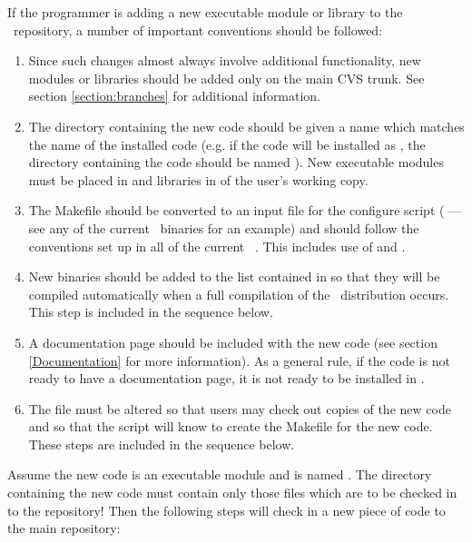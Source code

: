 If the programmer is adding a new executable module or library to the
\PSIthree\ repository, a number of important conventions should be followed:

\begin{enumerate}
\item Since such changes almost always involve additional functionality,
new modules or libraries should be added only on the main CVS trunk.
See section \ref{section:branches} for additional information.

\item The directory containing the new code should be given a name
which matches the name of the installed code (e.g. if the code
will be installed as , the directory containing
the code should be named ). New executable modules
must be placed in  and libraries in
 of the user's working copy.

\item The Makefile should be converted to an input file for the configure
script ( --- see any of the current \PSIthree\ binaries
for an example) and should follow the conventions set up in all of the
current \PSIthree\ . This includes use of 
and .

\item New binaries should be added to the list contained in
 so that they will be compiled
automatically when a full compilation of the \PSIthree\ distribution
occurs. This step is included in the sequence below.

\item A documentation page should be included with the new code (see
section \ref{Documentation} for more information). As a general rule,
if the code is not ready to have a documentation page, it is not ready
to be installed in \PSIthree. 

\item The  file must be altered so that users may check
out copies of the new code and so that the  script will
know to create the Makefile for the new code. These steps are included in
the sequence below.

\end{enumerate}

Assume the new code is an executable module and is named
. The directory containing the new code must contain
only those files which are to be checked in to the repository! Then the
following steps will check in a new piece of code to the main repository:

